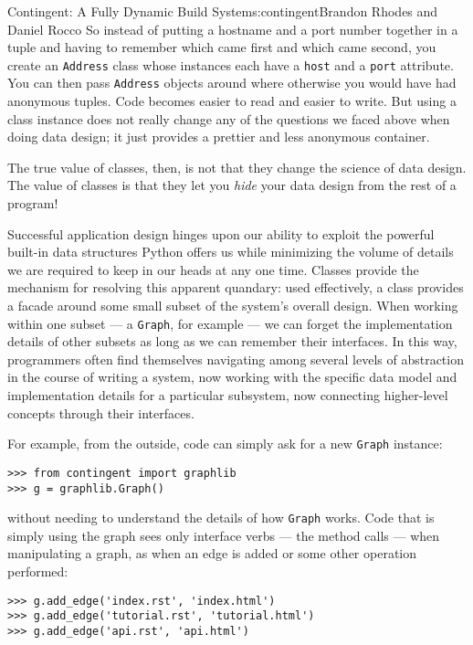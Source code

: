 \begin{aosachapter}{Contingent: A Fully Dynamic Build System}{s:contingent}{Brandon Rhodes and Daniel Rocco}
So instead of putting a hostname and a port number together in a tuple
and having to remember which came first and which came second, you
create an \texttt{Address} class whose instances each have a
\texttt{host} and a \texttt{port} attribute. You can then pass
\texttt{Address} objects around where otherwise you would have had
anonymous tuples. Code becomes easier to read and easier to write. But
using a class instance does not really change any of the questions we
faced above when doing data design; it just provides a prettier and less
anonymous container.

The true value of classes, then, is not that they change the science of
data design. The value of classes is that they let you \emph{hide} your
data design from the rest of a program!

Successful application design hinges upon our ability to exploit the
powerful built-in data structures Python offers us while minimizing the
volume of details we are required to keep in our heads at any one time.
Classes provide the mechanism for resolving this apparent quandary: used
effectively, a class provides a facade around some small subset of the
system's overall design. When working within one subset --- a
\texttt{Graph}, for example --- we can forget the implementation details
of other subsets as long as we can remember their interfaces. In this
way, programmers often find themselves navigating among several levels
of abstraction in the course of writing a system, now working with the
specific data model and implementation details for a particular
subsystem, now connecting higher-level concepts through their
interfaces.

For example, from the outside, code can simply ask for a new
\texttt{Graph} instance:

\begin{verbatim}
>>> from contingent import graphlib
>>> g = graphlib.Graph()
\end{verbatim}

without needing to understand the details of how \texttt{Graph} works.
Code that is simply using the graph sees only interface verbs --- the
method calls --- when manipulating a graph, as when an edge is added or
some other operation performed:

\begin{verbatim}
>>> g.add_edge('index.rst', 'index.html')
>>> g.add_edge('tutorial.rst', 'tutorial.html')
>>> g.add_edge('api.rst', 'api.html')
\end{verbatim}


\end{aosachapter}
